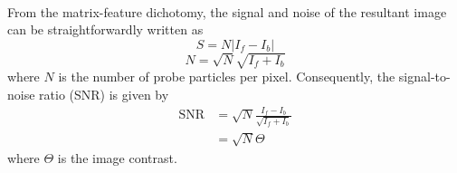 \documentclass[]{article}
\begin{document}
\paragraph{} From the matrix-feature dichotomy, the signal and noise of the resultant image can be straightforwardly written as
\begin{equation}
S = N|I_f-I_b|
\end{equation}
\begin{equation}
N = \sqrt{N}\sqrt{I_f+I_b}
\end{equation}
where $N$ is the number of probe particles per pixel. Consequently, the signal-to-noise ratio (SNR) is given by
\begin{equation}
\begin{aligned}
\mathrm{SNR} &= \sqrt{N}\frac{I_f-I_b}{\sqrt{I_f+I_b}} \\ &= \sqrt{N}\Theta
\end{aligned}
\end{equation}
where $\Theta$ is the image contrast. 
\end{document}
